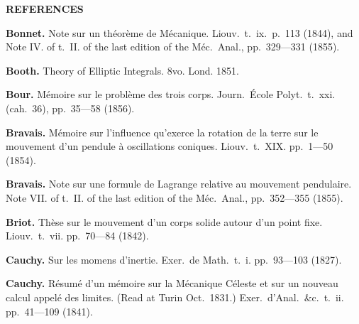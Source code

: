 \documentclass[11pt,a4paper]{book}
\begin{document}
\newpage


\begin{center}
\Large\bfseries REFERENCES
\end{center}

\noindent\textbf{Bonnet.} Note sur un th\'{e}or\`{e}me de M\'{e}canique. Liouv.~t.~ix.~p.~113 (1844), and Note IV. of t.~II. of the last edition of the M\'{e}c.~Anal., pp.~329---331 (1855).

\vspace{0.5em}

\noindent\textbf{Booth.} Theory of Elliptic Integrals. 8vo. Lond. 1851.

\vspace{0.5em}

\noindent\textbf{Bour.} M\'{e}moire sur le probl\`{e}me des trois corps. Journ.~\'{E}cole Polyt.~t.~xxi. (cah.~36), pp.~35---58 (1856).

\vspace{0.5em}

\noindent\textbf{Bravais.} M\'{e}moire sur l'influence qu'exerce la rotation de la terre sur le mouvement d'un pendule \`{a} oscillations coniques. Liouv.~t.~XIX. pp.~1---50 (1854).

\vspace{0.5em}

\noindent\textbf{Bravais.} Note sur une formule de Lagrange relative au mouvement pendulaire. Note VII. of t.~II. of the last edition of the M\'{e}c.~Anal., pp.~352---355 (1855).

\vspace{0.5em}

\noindent\textbf{Briot.} Th\`{e}se sur le mouvement d'un corps solide autour d'un point fixe. Liouv.~t.~vii. pp.~70---84 (1842).

\vspace{0.5em}

\noindent\textbf{Cauchy.} Sur les momens d'inertie. Exer.~de Math.~t.~i. pp.~93---103 (1827).

\vspace{0.5em}

\noindent\textbf{Cauchy.} R\'{e}sum\'{e} d'un m\'{e}moire sur la M\'{e}canique C\'{e}leste et sur un nouveau calcul appel\'{e} des limites. (Read at Turin Oct.~1831.) Exer.~d'Anal.~\&c.~t.~ii. pp.~41---109 (1841).
\end{document}

